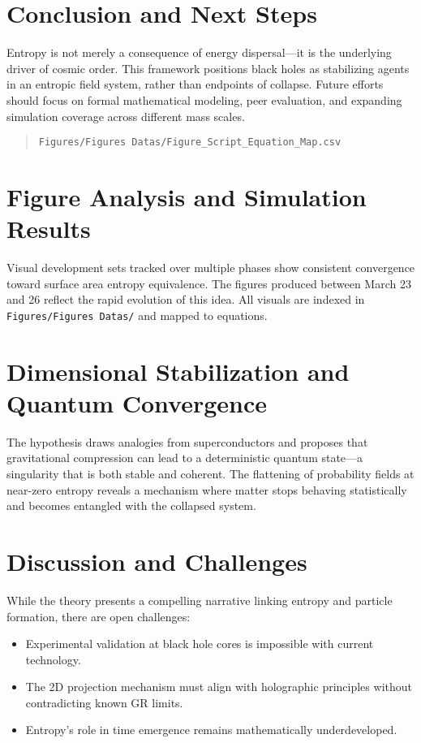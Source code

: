 \documentclass[12pt]{article}
\begin{document}
\section{Conclusion and Next Steps}
Entropy is not merely a consequence of energy dispersal—it is the underlying driver of cosmic order. This framework positions black holes as stabilizing agents in an entropic field system, rather than endpoints of collapse. Future efforts should focus on formal mathematical modeling, peer evaluation, and expanding simulation coverage across different mass scales.


\begin{quote}
\texttt{Figures/Figures Datas/Figure\_Script\_Equation\_Map.csv}
\end{quote}

\section{Figure Analysis and Simulation Results}
Visual development sets tracked over multiple phases show consistent convergence toward surface area entropy equivalence. The figures produced between March 23 and 26 reflect the rapid evolution of this idea. All visuals are indexed in \texttt{Figures/Figures Datas/} and mapped to equations.
\section{Dimensional Stabilization and Quantum Convergence}
The hypothesis draws analogies from superconductors and proposes that gravitational compression can lead to a deterministic quantum state—a singularity that is both stable and coherent. The flattening of probability fields at near-zero entropy reveals a mechanism where matter stops behaving statistically and becomes entangled with the collapsed system.
\section{Discussion and Challenges}
While the theory presents a compelling narrative linking entropy and particle formation, there are open challenges:
\begin{itemize}
    \item Experimental validation at black hole cores is impossible with current technology.
    \item The 2D projection mechanism must align with holographic principles without contradicting known GR limits.
    \item Entropy's role in time emergence remains mathematically underdeveloped.
\end{itemize}
\end{document}
